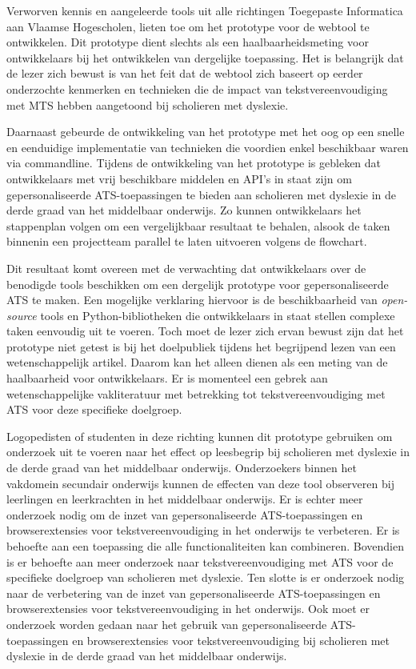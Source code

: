 \medspace

Verworven kennis en aangeleerde tools uit alle richtingen Toegepaste Informatica aan Vlaamse Hogescholen, lieten toe om het prototype voor de webtool te ontwikkelen. Dit prototype dient slechts als een haalbaarheidsmeting voor ontwikkelaars bij het ontwikkelen van dergelijke toepassing. Het is belangrijk dat de lezer zich bewust is van het feit dat de webtool zich baseert op eerder onderzochte kenmerken en technieken die de impact van tekstvereenvoudiging met MTS hebben aangetoond bij scholieren met dyslexie. 

Daarnaast gebeurde de ontwikkeling van het prototype met het oog op een snelle en eenduidige implementatie van technieken die voordien enkel beschikbaar waren via commandline. Tijdens de ontwikkeling van het prototype is gebleken dat ontwikkelaars met vrij beschikbare middelen en API's in staat zijn om gepersonaliseerde ATS-toepassingen te bieden aan scholieren met dyslexie in de derde graad van het middelbaar onderwijs. Zo kunnen ontwikkelaars het stappenplan volgen om een vergelijkbaar resultaat te behalen, alsook de taken binnenin een projectteam parallel te laten uitvoeren volgens de flowchart.

Dit resultaat komt overeen met de verwachting dat ontwikkelaars over de benodigde tools beschikken om een dergelijk prototype voor gepersonaliseerde ATS te maken. Een mogelijke verklaring hiervoor is de beschikbaarheid van \textit{open-source} tools en Python-bibliotheken die ontwikkelaars in staat stellen complexe taken eenvoudig uit te voeren. Toch moet de lezer zich ervan bewust zijn dat het prototype niet getest is bij het doelpubliek tijdens het begrijpend lezen van een wetenschappelijk artikel. Daarom kan het alleen dienen als een meting van de haalbaarheid voor ontwikkelaars. Er is momenteel een gebrek aan wetenschappelijke vakliteratuur met betrekking tot tekstvereenvoudiging met ATS voor deze specifieke doelgroep.

Logopedisten of studenten in deze richting kunnen dit prototype gebruiken om onderzoek uit te voeren naar het effect op leesbegrip bij scholieren met dyslexie in de derde graad van het middelbaar onderwijs. Onderzoekers binnen het vakdomein secundair onderwijs kunnen de effecten van deze tool observeren bij leerlingen en leerkrachten in het middelbaar onderwijs. Er is echter meer onderzoek nodig om de inzet van gepersonaliseerde ATS-toepassingen en browserextensies voor tekstvereenvoudiging in het onderwijs te verbeteren. Er is behoefte aan een toepassing die alle functionaliteiten kan combineren. Bovendien is er behoefte aan meer onderzoek naar tekstvereenvoudiging met ATS voor de specifieke doelgroep van scholieren met dyslexie. Ten slotte is er onderzoek nodig naar de verbetering van de inzet van gepersonaliseerde ATS-toepassingen en browserextensies voor tekstvereenvoudiging in het onderwijs. Ook moet er onderzoek worden gedaan naar het gebruik van gepersonaliseerde ATS-toepassingen en browserextensies voor tekstvereenvoudiging bij scholieren met dyslexie in de derde graad van het middelbaar onderwijs.